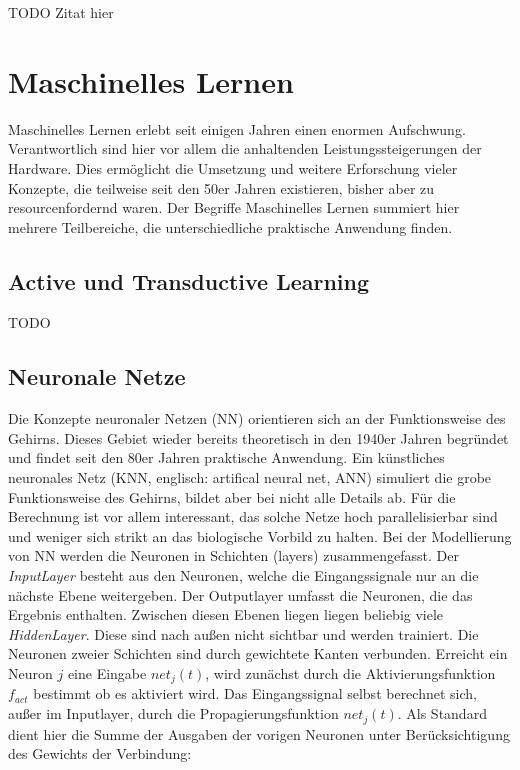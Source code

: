 TODO
Zitat hier \cite{rum2011}

\section{Maschinelles Lernen}

Maschinelles Lernen erlebt seit einigen Jahren einen enormen Aufschwung. Verantwortlich sind hier vor allem die anhaltenden Leistungssteigerungen der Hardware. Dies ermöglicht die Umsetzung und weitere Erforschung vieler Konzepte, die teilweise seit den 50er Jahren existieren, bisher aber zu resourcenfordernd waren. Der Begriffe Maschinelles Lernen summiert hier mehrere Teilbereiche, die unterschiedliche praktische Anwendung finden.

\subsection{Active und Transductive Learning}

TODO

\subsection{Neuronale Netze}

Die Konzepte neuronaler Netzen (NN) orientieren sich an der Funktionsweise des Gehirns. Dieses Gebiet wieder bereits theoretisch in den 1940er Jahren begründet und findet seit den 80er Jahren praktische Anwendung. Ein künstliches neuronales Netz (KNN, englisch: artifical neural net, ANN) simuliert die grobe Funktionsweise des Gehirns, bildet aber bei nicht alle Details ab. Für die Berechnung ist vor allem interessant, das solche Netze hoch parallelisierbar sind und weniger sich strikt an das biologische Vorbild zu halten. Bei der Modellierung von NN werden die Neuronen in Schichten (layers) zusammengefasst. Der \textit{InputLayer} besteht aus den Neuronen, welche die Eingangssignale nur an die nächste Ebene weitergeben. Der Outputlayer umfasst die Neuronen, die das Ergebnis enthalten. Zwischen diesen Ebenen liegen liegen beliebig viele \textit{HiddenLayer}. Diese sind nach außen nicht sichtbar und werden trainiert. Die Neuronen zweier Schichten sind durch gewichtete Kanten verbunden. Erreicht ein Neuron $j$ eine Eingabe $net_{j}(t)$, wird zunächst durch die Aktivierungsfunktion $f_{act}$ bestimmt ob es aktiviert wird. Das Eingangssignal selbst berechnet sich, außer im Inputlayer, durch die Propagierungsfunktion $net_{j}(t)$. Als Standard dient hier die Summe der Ausgaben der vorigen Neuronen unter Berücksichtigung des Gewichts der Verbindung: 

